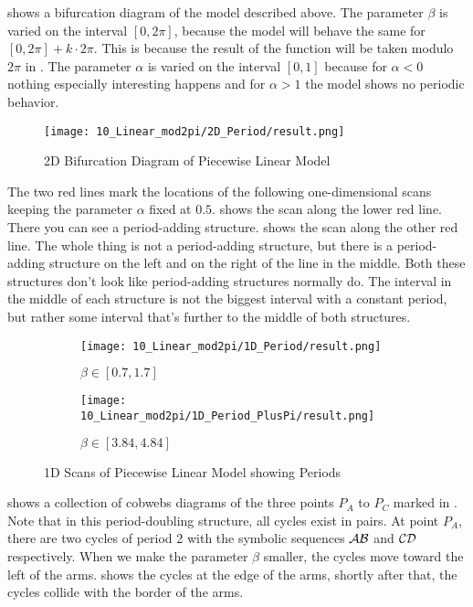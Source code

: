  shows a bifurcation diagram of the model described above.
The parameter $\beta$ is varied on the interval $[0, 2 \pi]$, because the model will behave the same for $[0, 2 \pi] + k \cdot 2 \pi$.
This is because the result of the function will be taken modulo $2 \pi$ in .
The parameter $\alpha$ is varied on the interval $[0, 1]$ because for $\alpha < 0$ nothing especially interesting happens and for $\alpha > 1$ the model shows no periodic behavior.

\begin{figure}
    \centering
    \texttt{[image: 10\_Linear\_mod2pi/2D\_Period/result.png]}
    \caption{2D Bifurcation Diagram of Piecewise Linear Model}
    \label{fig:pcw.lin.2d}
\end{figure}

The two red lines mark the locations of the following one-dimensional scans keeping the parameter $\alpha$ fixed at $0.5$.
 shows the scan along the lower red line.
There you can see a period-adding structure.
 shows the scan along the other red line.
The whole thing is not a period-adding structure, but there is a period-adding structure on the left and on the right of the line in the middle.
Both these structures don't look like period-adding structures normally do.
The interval in the middle of each structure is not the biggest interval with a constant period, but rather some interval that's further to the middle of both structures.

\begin{figure}
    \centering
    \begin{subfigure}{0.4\textwidth}
        \centering
        \texttt{[image: 10\_Linear\_mod2pi/1D\_Period/result.png]}
        \caption{$\beta \in [0.7, 1.7]$}
        \label{fig:pcw.lin.1D}
    \end{subfigure}
    \begin{subfigure}{0.4\textwidth}
        \centering
        \texttt{[image: 10\_Linear\_mod2pi/1D\_Period\_PlusPi/result.png]}
        \caption{$\beta \in [3.84, 4.84]$}
        \label{fig:pcw.lin.1DPlusPi}
    \end{subfigure}
    \caption{1D Scans of Piecewise Linear Model showing Periods}
\end{figure}

 shows a collection of cobwebs diagrams of the three points $P_A$ to $P_C$ marked in .
Note that in this period-doubling structure, all cycles exist in pairs.
At point $P_A$, there are two cycles of period 2 with the symbolic sequences $\mathcal{A}\mathcal{B}$ and $\mathcal{C}\mathcal{D}$ respectively.
When we make the parameter $\beta$ smaller, the cycles move toward the left of the arms.
 shows the cycles at the edge of the arms, shortly after that, the cycles collide with the border of the arms.

